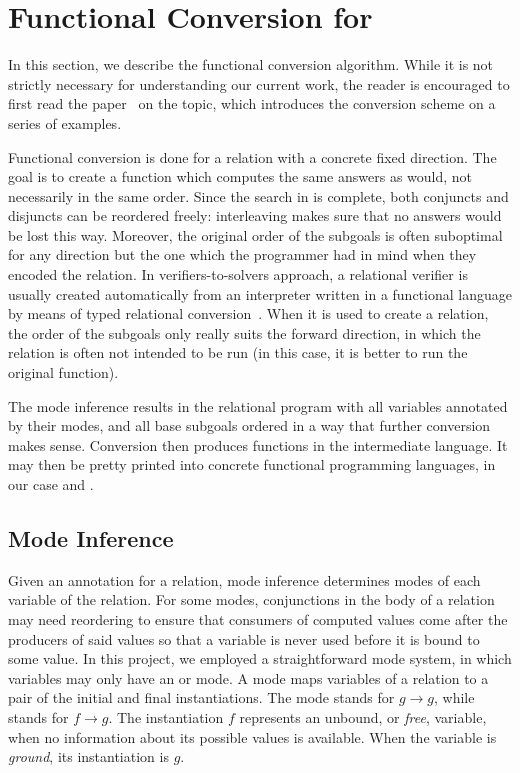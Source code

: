 
\section{Functional Conversion for \mk}
\label{sec:conversion}

In this section, we describe the functional conversion algorithm.
While it is not strictly necessary for understanding our current work, the reader is encouraged to first read the paper~\cite{verbitskaia2022direction} on the topic, which introduces the conversion scheme on a series of examples.


Functional conversion is done for a relation with a concrete fixed direction.
The goal is to create a function which computes the same answers as \mk would, not necessarily in the same order.
Since the search in \mk is complete, both conjuncts and disjuncts can be reordered freely: interleaving makes sure that no answers would be lost this way.
Moreover, the original order of the subgoals is often suboptimal for any direction but the one which the programmer had in mind when they encoded the relation.
In verifiers-to-solvers approach, a relational verifier is usually created automatically from an interpreter written in a functional language by means of typed relational conversion~\cite{lozov2018typed}.
When it is used to create a relation, the order of the subgoals only really suits the forward direction, in which the relation is often not intended to be run (in this case, it is better to run the original function).

The mode inference results in the relational program with all variables annotated by their modes, and all base subgoals ordered in a way that further conversion makes sense.
Conversion then produces functions in the intermediate language.
It may then be pretty printed into concrete functional programming languages, in our case \haskell and \ocaml.

\subsection{Mode Inference}



Given an annotation for a relation, mode inference determines modes of each variable of the relation.
For some modes, conjunctions in the body of a relation may need reordering to ensure that consumers of computed values come after the producers of said values so that a variable is never used before it is bound to some value.
In this project, we employed a straightforward mode system, in which variables may only have an \inm or \outm mode.
A mode maps variables of a relation to a pair of the initial and final instantiations.
The mode \inm stands for $g \rightarrow g$, while \outm stands for $f \rightarrow g$.
The instantiation $f$ represents an unbound, or \emph{free}, variable, when no information about its possible values is available.
When the variable is \emph{ground}, its instantiation is $g$.

